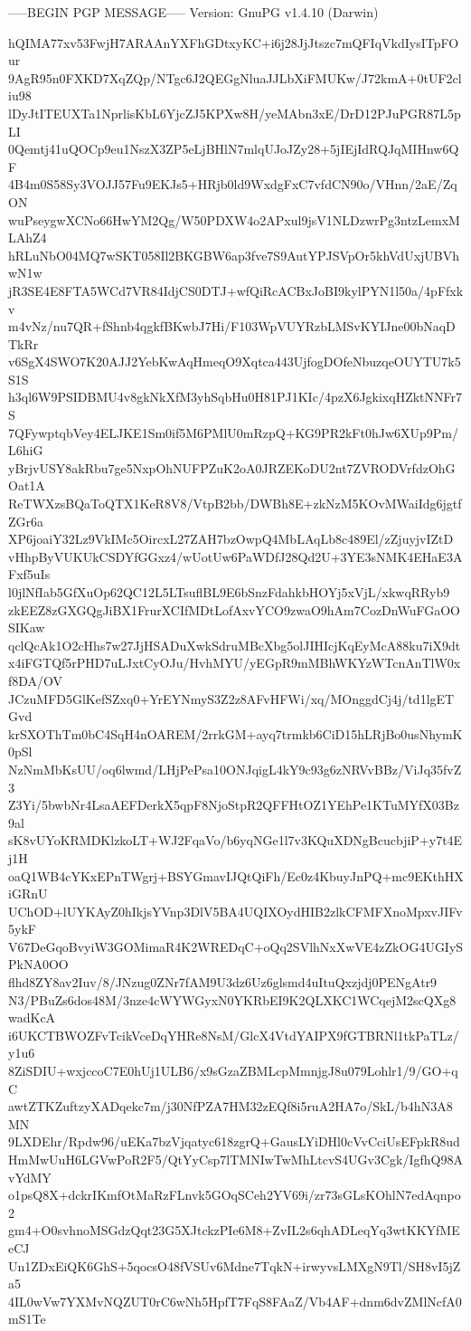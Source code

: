 -----BEGIN PGP MESSAGE-----
Version: GnuPG v1.4.10 (Darwin)

hQIMA77xv53FwjH7ARAAnYXFhGDtxyKC+i6j28JjJtszc7mQFIqVkdIysITpFOur
9AgR95n0FXKD7XqZQp/NTgc6J2QEGgNluaJJLbXiFMUKw/J72kmA+0tUF2cliu98
lDyJtITEUXTa1NprlisKbL6YjcZJ5KPXw8H/yeMAbn3xE/DrD12PJuPGR87L5pLI
0Qemtj41uQOCp9eu1NszX3ZP5eLjBHlN7mlqUJoJZy28+5jIEjIdRQJqMIHnw6QF
4B4m0S58Sy3VOJJ57Fu9EKJs5+HRjb0ld9WxdgFxC7vfdCN90o/VHnn/2aE/ZqON
wuPseygwXCNo66HwYM2Qg/W50PDXW4o2APxul9jsV1NLDzwrPg3ntzLemxMLAhZ4
hRLuNbO04MQ7wSKT058Il2BKGBW6ap3fve7S9AutYPJSVpOr5khVdUxjUBVhwN1w
jR3SE4E8FTA5WCd7VR84IdjCS0DTJ+wfQiRcACBxJoBI9kylPYN1l50a/4pFfxkv
m4vNz/nu7QR+fShnb4qgkfBKwbJ7Hi/F103WpVUYRzbLMSvKYIJne00bNaqDTkRr
v6SgX4SWO7K20AJJ2YebKwAqHmeqO9Xqtca443UjfogDOfeNbuzqeOUYTU7k5S1S
h3ql6W9PSIDBMU4v8gkNkXfM3yhSqbHu0H81PJ1KIc/4pzX6JgkixqHZktNNFr7S
7QFywptqbVey4ELJKE1Sm0if5M6PMlU0mRzpQ+KG9PR2kFt0hJw6XUp9Pm/L6hiG
yBrjvUSY8akRbu7ge5NxpOhNUFPZuK2oA0JRZEKoDU2nt7ZVRODVrfdzOhGOat1A
ReTWXzsBQaToQTX1KeR8V8/VtpB2bb/DWBh8E+zkNzM5KOvMWaiIdg6jgtfZGr6a
XP6joaiY32Lz9VkIMc5OircxL27ZAH7bzOwpQ4MbLAqLb8c489El/zZjuyjvIZtD
vHhpByVUKUkCSDYfGGxz4/wUotUw6PaWDfJ28Qd2U+3YE3sNMK4EHaE3AFxf5uIs
l0jlNfIab5GfXuOp62QC12L5LTsuflBL9E6bSnzFdahkbHOYj5xVjL/xkwqRRyb9
zkEEZ8zGXGQgJiBX1FrurXCIfMDtLofAxvYCO9zwaO9hAm7CozDnWuFGaOOSIKaw
qclQcAk1O2cHhs7w27JjHSADuXwkSdruMBcXbg5olJIHIcjKqEyMcA88ku7iX9dt
x4iFGTQf5rPHD7uLJxtCyOJu/HvhMYU/yEGpR9mMBhWKYzWTcnAnTlW0xf8DA/OV
JCzuMFD5GlKefSZxq0+YrEYNmyS3Z2z8AFvHFWi/xq/MOnggdCj4j/td1lgETGvd
krSXOThTm0bC4SqH4nOAREM/2rrkGM+ayq7trmkb6CiD15hLRjBo0usNhymK0pSl
NzNmMbKsUU/oq6lwmd/LHjPePsa10ONJqigL4kY9c93g6zNRVvBBz/ViJq35fvZ3
Z3Yi/5bwbNr4LsaAEFDerkX5qpF8NjoStpR2QFFHtOZ1YEhPe1KTuMYfX03Bz9al
sK8vUYoKRMDKlzkoLT+WJ2FqaVo/b6yqNGe1l7v3KQuXDNgBcucbjiP+y7t4Ej1H
oaQ1WB4cYKxEPnTWgrj+BSYGmavIJQtQiFh/Ec0z4KbuyJnPQ+mc9EKthHXiGRnU
UChOD+lUYKAyZ0hIkjsYVnp3DlV5BA4UQIXOydHIB2zlkCFMFXnoMpxvJIFv5ykF
V67DeGqoBvyiW3GOMimaR4K2WREDqC+oQq2SVlhNxXwVE4zZkOG4UGIySPkNA0OO
flhd8ZY8av2Iuv/8/JNzug0ZNr7fAM9U3dz6Uz6glsmd4uItuQxzjdj0PENgAtr9
N3/PBuZs6dos48M/3nze4cWYWGyxN0YKRbEI9K2QLXKC1WCqejM2scQXg8wadKcA
i6UKCTBWOZFvTcikVceDqYHRe8NsM/GlcX4VtdYAIPX9fGTBRNl1tkPaTLz/y1u6
8ZiSDIU+wxjccoC7E0hUj1ULB6/x9sGzaZBMLcpMmnjgJ8u079Lohlr1/9/GO+qC
awtZTKZuftzyXADqekc7m/j30NfPZA7HM32zEQf8i5ruA2HA7o/SkL/b4hN3A8MN
9LXDEhr/Rpdw96/uEKa7bzVjqatyc618zgrQ+GausLYiDHl0cVvCciUsEFpkR8ud
HmMwUuH6LGVwPoR2F5/QtYyCsp7lTMNIwTwMhLtcvS4UGv3Cgk/IgfhQ98AvYdMY
o1psQ8X+dckrIKmfOtMaRzFLnvk5GOqSCeh2YV69i/zr73sGLsKOhlN7edAqnpo2
gm4+O0svhnoMSGdzQqt23G5XJtckzPIe6M8+ZvIL2s6qhADLeqYq3wtKKYfMEeCJ
Un1ZDxEiQK6GhS+5qocsO48fVSUv6Mdne7TqkN+irwyvsLMXgN9Tl/SH8vI5jZa5
4IL0wVw7YXMvNQZUT0rC6wNh5HpfT7FqS8FAaZ/Vb4AF+dnm6dvZMlNcfA0mS1Te
